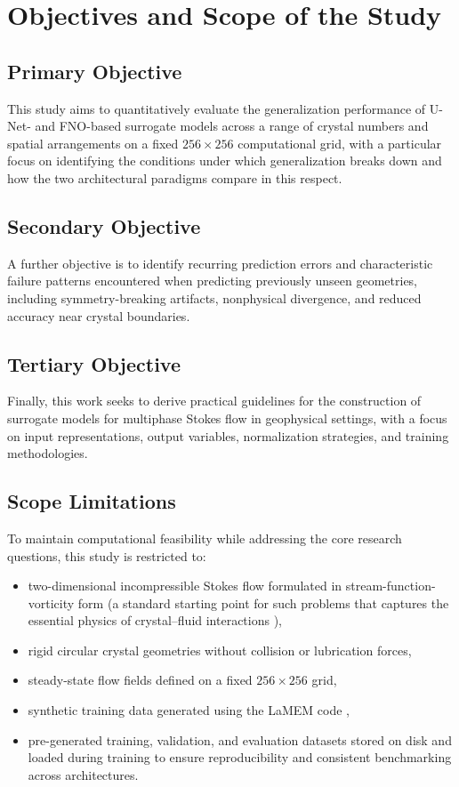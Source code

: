 \section{Objectives and Scope of the Study}

\subsection{Primary Objective}
This study aims to quantitatively evaluate the generalization performance of U-Net- and FNO-based surrogate models across a range of crystal numbers and spatial arrangements on a fixed $256 \times 256$ computational grid, with a particular focus on identifying the conditions under which generalization breaks down and how the two architectural paradigms compare in this respect.

\subsection{Secondary Objective}
A further objective is to identify recurring prediction errors and characteristic failure patterns encountered when predicting previously unseen geometries, including symmetry-breaking artifacts, nonphysical divergence, and reduced accuracy near crystal boundaries.

\subsection{Tertiary Objective}
Finally, this work seeks to derive practical guidelines for the construction of surrogate models for multiphase Stokes flow in geophysical settings, with a focus on input representations, output variables, normalization strategies, and training methodologies.

\subsection{Scope Limitations}

To maintain computational feasibility while addressing the core research questions, this study is restricted to:

\begin{itemize}
    \item two-dimensional incompressible Stokes flow formulated in stream-function-vorticity form (a standard starting point for such problems that captures the essential physics of crystal--fluid interactions \parencite{weinstein_evolution_1988,verhoeven_numerical_2009}),
    \item rigid circular crystal geometries without collision or lubrication forces,
    \item steady-state flow fields defined on a fixed $256 \times 256$ grid,
    \item synthetic training data generated using the LaMEM code \parencite{Popov2013LaMEM},
    \item pre-generated training, validation, and evaluation datasets stored on disk and loaded during training to ensure reproducibility and consistent benchmarking across architectures.
\end{itemize}

